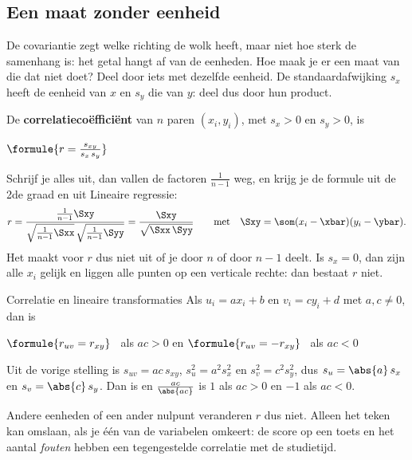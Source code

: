 \subsection{Een maat zonder eenheid}

De covariantie zegt welke richting de wolk heeft, maar niet hoe sterk de samenhang is: het getal hangt af van de eenheden. Hoe maak je er een maat van die dat niet doet? Deel door iets met dezelfde eenheid. De standaardafwijking $s_x$ heeft de eenheid van $x$ en $s_y$ die van $y$: deel dus door hun product.

\begin{theorie}
De \textbf{\textcolor{accent}{correlatiecoëfficiënt}} van $n$ paren $(x_i, y_i)$, met $s_x > 0$ en $s_y > 0$, is

\vspace{1mm}
\qquad $\formule{r = \frac{s_{xy}}{s_x\,s_y}}$
\end{theorie}

Schrijf je alles uit, dan vallen de factoren $\frac{1}{n - 1}$ weg, en krijg je de formule uit de 2de graad en uit Lineaire regressie:
\[ r = \frac{\frac{1}{n-1}\Sxy}{\sqrt{\frac{1}{n-1}\Sxx}\,\sqrt{\frac{1}{n-1}\Syy}} = \frac{\Sxy}{\sqrt{\Sxx\,\Syy}} \qquad\text{met}\quad \Sxy = \som (x_i - \xbar)(y_i - \ybar) . \]
Het maakt voor $r$ dus niet uit of je door $n$ of door $n - 1$ deelt. Is $s_x = 0$, dan zijn alle $x_i$ gelijk en liggen alle punten op een verticale rechte: dan bestaat $r$ niet.

\begin{theorie}
\begin{stelling}{Correlatie en lineaire transformaties}
Als $u_i = a x_i + b$ en $v_i = c y_i + d$ met $a, c \neq 0$, dan is

\qquad $\formule{r_{uv} = r_{xy}}$ \ als $ac > 0$ \qquad en \qquad $\formule{r_{uv} = -r_{xy}}$ \ als $ac < 0$
\end{stelling}

\begin{bewijs}
Uit de vorige stelling is $s_{uv} = ac\,s_{xy}$, $s_u^2 = a^2 s_x^2$ en $s_v^2 = c^2 s_y^2$, dus $s_u = \abs{a}\,s_x$ en $s_v = \abs{c}\,s_y$. Dan is
en $\frac{ac}{\abs{ac}}$ is $1$ als $ac > 0$ en $-1$ als $ac < 0$.
\end{bewijs}
\end{theorie}

Andere eenheden of een ander nulpunt veranderen $r$ dus niet. Alleen het teken kan omslaan, als je één van de variabelen omkeert: de score op een toets en het aantal \textit{fouten} hebben een tegengestelde correlatie met de studietijd.

